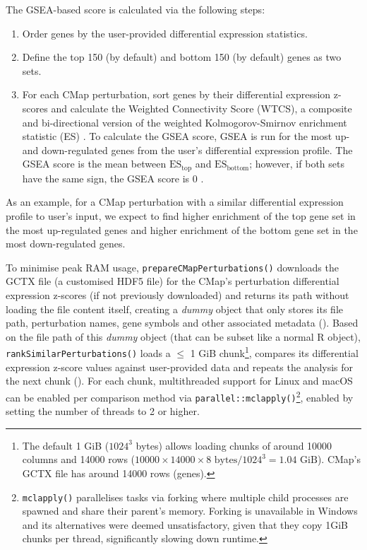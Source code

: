 The GSEA-based score is calculated via the following steps:

\begin{enumerate}
	\item Order genes by the user-provided differential expression statistics.
	\item Define the top 150 (by default) and bottom 150 (by default) genes as two sets.
	\item For each CMap perturbation, sort genes by their differential expression z-scores and calculate the Weighted Connectivity Score (WTCS), a composite and bi-directional version of the weighted Kolmogorov-Smirnov enrichment statistic (ES) \cite{subramanian:2017ul}. To calculate the GSEA score, GSEA is run for the most up- and down-regulated genes from the user’s differential expression profile. The GSEA score is the mean between $\textrm{ES}_{\textrm{top}}$ and $\textrm{ES}_{\textrm{bottom}}$; however, if both sets have the same sign, the GSEA score is 0 \cite{subramanian:2017ul}.
\end{enumerate}

As an example, for a CMap perturbation with a similar differential expression profile to user’s input, we expect to find higher enrichment of the top gene set in the most up-regulated genes and higher enrichment of the bottom gene set in the most down-regulated genes.

To minimise peak RAM usage, \texttt{prepareCMapPerturbations()} downloads the GCTX file (a customised HDF5 file) for the CMap’s perturbation differential expression z-scores (if not previously downloaded) and returns its path without loading the file content itself, creating a \emph{dummy} object that only stores its file path, perturbation names, gene symbols and other associated metadata (). Based on the file path of this \emph{dummy} object (that can be subset like a normal R object), \texttt{rankSimilarPerturbations()} loads a $\le$ 1 GiB chunk\footnote{The default 1 GiB ($1024^3$ bytes) allows loading chunks of around 10000 columns and 14000 rows ($10000 \times 14000 \times 8 \textrm{ bytes} / 1024^3 = 1.04 \textrm{ GiB}$). CMap's GCTX file has around 14000 rows (genes).}, compares its differential expression z-score values against user-provided data and repeats the analysis for the next chunk (). For each chunk, multithreaded support for Linux and macOS can be enabled per comparison method via \texttt{parallel::mclapply()}\footnote{\texttt{mclapply()} parallelises tasks via forking where multiple child processes are spawned and share their parent's memory. Forking is unavailable in Windows and its alternatives were deemed unsatisfactory, given that they copy 1GiB chunks per thread, significantly slowing down runtime.}, enabled by setting the number of threads to 2 or higher.

